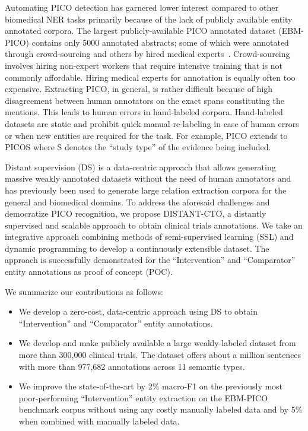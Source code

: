 \documentclass[11pt]{article}
\begin{document}
Automating PICO detection has garnered lower interest compared to other biomedical NER tasks primarily because of the lack of publicly available entity annotated corpora.
The largest publicly-available PICO annotated dataset (EBM-PICO) contains only 5000 annotated abstracts; some of which were annotated through crowd-sourcing and others by hired medical experts~\cite{nye2018corpus}.
Crowd-sourcing involves hiring non-expert workers that require intensive training that is not commonly affordable.
Hiring medical experts for annotation is equally often too expensive.
Extracting PICO, in general, is rather difficult because of high disagreement between human annotators on the exact spans constituting the mentions.
This leads to human errors in hand-labeled corpora.
Hand-labeled datasets are static and prohibit quick manual re-labeling in case of human errors or when new entities are required for the task. For example, PICO extends to PICOS where S denotes the ``study type'' of the evidence being included.

Distant supervision (DS) is a data-centric approach that allows generating massive weakly annotated datasets without the need of human annotators and has previously been used to generate large relation extraction corpora for the general and biomedical domains.
To address the aforesaid challenges and democratize PICO recognition, we propose DISTANT-CTO, a distantly supervised and scalable approach to obtain clinical trials annotations.
We take an integrative approach combining methods of semi-supervised learning (SSL) and dynamic programming to develop a continuously extensible dataset.
The approach is successfully demonstrated for the ``Intervention'' and ``Comparator'' entity annotations as proof of concept (POC).


We summarize our contributions as follows:
%
\begin{itemize}
    \item We develop a zero-cost, data-centric approach using DS to obtain ``Intervention'' and ``Comparator'' entity annotations.
    \item We develop and make publicly available a large weakly-labeled dataset from more than 300,000 clinical trials. The dataset offers about a million sentences with more than 977,682 annotations across 11 semantic types.
    \item We improve the state-of-the-art by 2\% macro-F1 on the previously most poor-performing ``Intervention'' entity extraction on the EBM-PICO benchmark corpus without using any costly manually labeled data and by 5\% when combined with manually labeled data.
\end{itemize}
%
%
%
\end{document}
